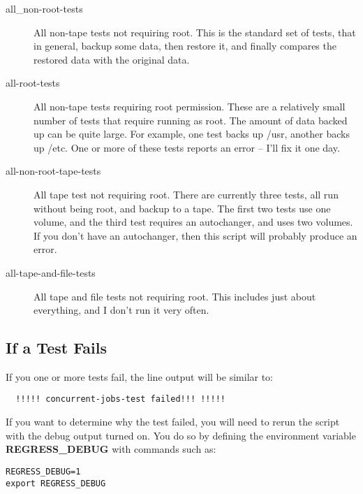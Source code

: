 \begin{description}

\item [all\_non-root-tests]
   All non-tape tests not requiring root.  This is the standard set of tests,
that in general, backup some  data, then restore it, and finally compares the
restored data  with the original data.  

\item [all-root-tests]
   All non-tape tests requiring root permission.  These are a relatively small
number of tests that require running  as root. The amount of data backed up
can be quite large. For  example, one test backs up /usr, another backs up
/etc. One  or more of these tests reports an error -- I'll fix it one  day. 

\item [all-non-root-tape-tests]
   All tape test not requiring root.  There are currently three tests, all run
without being root,  and backup to a tape. The first two tests use one volume,
and the third test requires an autochanger, and uses two  volumes. If you
don't have an autochanger, then this script  will probably produce an error. 

\item [all-tape-and-file-tests]
   All tape and file tests not requiring  root. This includes just about
everything, and I don't run it  very often. 
\end{description}

\subsection{If a Test Fails}

If you one or more tests fail, the line output will be similar to: 

\footnotesize
\begin{verbatim}
  !!!!! concurrent-jobs-test failed!!! !!!!!
\end{verbatim}
\normalsize

If you want to determine why the test failed, you will need to rerun the
script with the debug output turned on.  You do so by defining the
environment variable {\bf REGRESS\_DEBUG} with commands such as:

\begin{verbatim}
REGRESS_DEBUG=1
export REGRESS_DEBUG
\end{verbatim}

